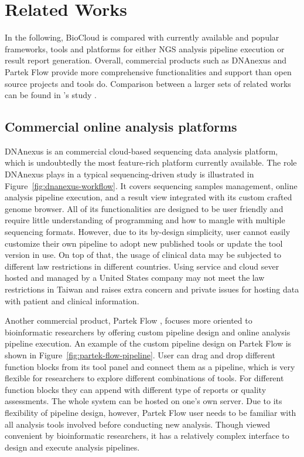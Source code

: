 \chapter{Related Works}
\label{c:related-work}

In the following, BioCloud is compared with currently available and popular
frameworks, tools and platforms for either NGS analysis pipeline execution or
result report generation. Overall, commercial products such as DNAnexus and
Partek Flow provide more comprehensive functionalities and support than open
source projects and tools do. Comparison between a larger sets of related works
can be found in \citeauthor{leipzig2016:review}'s study
\cite{leipzig2016:review}.


\section{Commercial online analysis platforms}

DNAnexus \cite{:dnanexus} is an commercial cloud-based sequencing data analysis
platform, which is undoubtedly the most feature-rich platform currently
available. The role DNAnexus plays in a typical sequencing-driven study is
illustrated in Figure~\ref{fig:dnanexus-workflow}. It covers sequencing samples
management, online analysis pipeline execution, and a result view integrated
with its custom crafted genome browser. All of its functionalities are designed
to be user friendly and require little understanding of programming and how to
mangle with multiple sequencing formats. However, due to its by-design
simplicity, user cannot easily customize their own pipeline to adopt new
published tools or update the tool version in use. On top of that, the usage of
clinical data may be subjected to different law restrictions in different
countries. Using service and cloud sever hosted and managed by a United States
company may not meet the law restrictions in Taiwan and raises extra concern
and private issues for hosting data with patient and clinical information.



Another commercial product, Partek Flow \cite{:partek}, focuses more oriented
to bioinformatic researchers by offering custom pipeline design and online
analysis pipeline execution. An example of the custom pipeline design on Partek
Flow is shown in Figure~\ref{fig:partek-flow-pipeline}. User can drag and drop
different function blocks from its tool panel and connect them as a pipeline,
which is very flexible for researchers to explore different combinations of
tools. For different function blocks they can append with different type of
reports or quality assessments. The whole system can be hosted on one's own
server. Due to its flexibility of pipeline design, however, Partek Flow user
needs to be familiar with all analysis tools involved before conducting new
analysis. Though viewed convenient by bioinformatic researchers, it has a
relatively complex interface to design and execute analysis pipelines.

